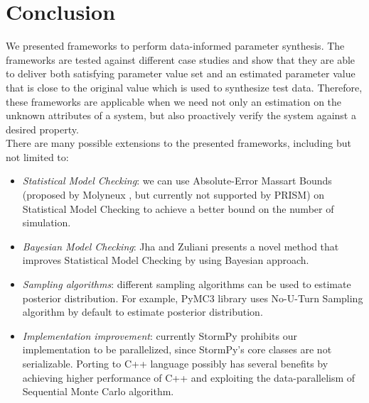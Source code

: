 \chapter{Conclusion}
We presented frameworks to perform data-informed parameter synthesis. The frameworks are tested
against different case studies and show that they are able to deliver both satisfying parameter
value set and an estimated parameter value that is close to the original value which is used to
synthesize test data. Therefore, these frameworks are applicable when we need not only an estimation
on the unknown attributes of a system, but also proactively verify the system against a desired property.\\
There are many possible extensions to the presented frameworks, including but not limited to:
\begin{itemize}
      \item \textit{Statistical Model Checking}: we can use Absolute-Error Massart Bounds (proposed by
            Molyneux \cite{molyneux2020abc}, but currently not supported by PRISM) on Statistical
            Model Checking to achieve a better bound on the number of simulation.
      \item \textit{Bayesian Model Checking}: Jha \cite{jha2009bayesian} and Zuliani
            \cite{zuliani2013bayesian} presents a novel method that improves Statistical Model
            Checking by using Bayesian approach.
      \item \textit{Sampling algorithms}: different sampling algorithms can be used to estimate
            posterior distribution. For example, PyMC3 library \cite{salvatier2016pymc3} uses
            No-U-Turn Sampling algorithm by default to estimate posterior distribution.
      \item \textit{Implementation improvement}: currently StormPy prohibits our implementation to be
            parallelized, since StormPy's core classes are not serializable. Porting to C++ language
            possibly has several benefits by achieving higher performance of C++ and exploiting the
            data-parallelism of Sequential Monte Carlo algorithm.
\end{itemize}